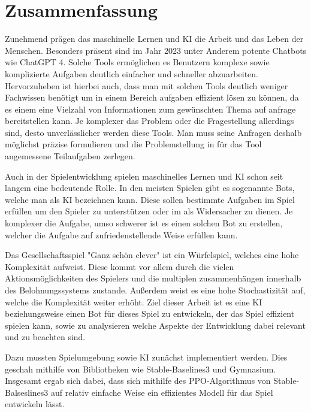 \section{Zusammenfassung}

Zunehmend prägen das maschinelle Lernen und KI die Arbeit und das Leben der Menschen. Besonders präsent sind im Jahr 2023 unter Anderem potente Chatbots wie ChatGPT 4. Solche Tools ermöglichen es Benutzern komplexe sowie komplizierte Aufgaben deutlich einfacher und schneller abzuarbeiten. Hervorzuheben ist hierbei auch, dass man mit solchen Tools deutlich weniger Fachwissen benötigt um in einem Bereich aufgaben effizient lösen zu können, da es einem eine Vielzahl von Informationen zum gewünschten Thema auf anfrage bereitstellen kann. Je komplexer das Problem oder die Fragestellung allerdings sind, desto unverlässlicher werden diese Tools. Man muss seine Anfragen deshalb möglichst präzise formulieren und die Problemstellung in für das Tool angemessene Teilaufgaben zerlegen.

Auch in der Spielentwicklung spielen maschinelles Lernen und KI schon seit langem eine bedeutende Rolle. In den meisten Spielen gibt es sogenannte Bots, welche man als KI bezeichnen kann. Diese sollen bestimmte Aufgaben im Spiel erfüllen um den Spieler zu unterstützen oder im als Widersacher zu dienen. Je komplexer die Aufgabe, umso schwerer ist es einen solchen Bot zu erstellen, welcher die Aufgabe auf zufriedenstellende Weise erfüllen kann.

Das Gesellschaftsspiel "Ganz schön clever" ist ein Würfelspiel, welches eine hohe Komplexität aufweist. Diese kommt vor allem durch die vielen Aktionsmöglichkeiten des Spielers und die multiplen zusammenhängen innerhalb des Belohnungssystems zustande. Außerdem weist es eine hohe Stochastizität auf, welche die Komplexität weiter erhöht.
Ziel dieser Arbeit ist es eine KI beziehungsweise einen Bot für dieses Spiel zu entwickeln, der das Spiel effizient spielen kann, sowie zu analysieren welche Aspekte der Entwicklung dabei relevant und zu beachten sind.

Dazu mussten Spielumgebung sowie KI zunächst implementiert werden. Dies geschah mithilfe von Bibliotheken wie Stable-Baselines3 und Gymnasium.
Insgesamt ergab sich dabei, dass sich mithilfe des PPO-Algorithmus von Stable-Balseslines3 auf relativ einfache Weise ein effizientes Modell für das Spiel entwickeln lässt.